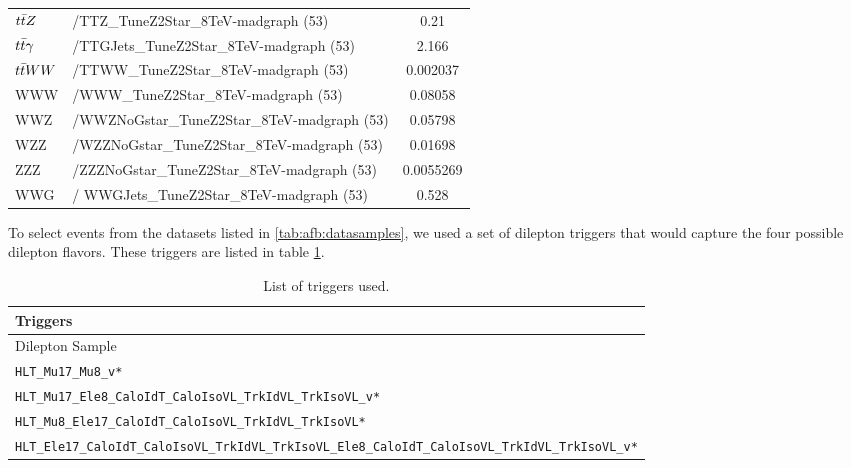 \begin{table}[!ht]
\begin{center}
{\begin{tabular}{l|l|c}
$t\bar{t} Z$                                       &   /TTZ\_TuneZ2Star\_8TeV-madgraph (53)                   &  0.21 \\
$t\bar{t} \gamma$                      &   /TTGJets\_TuneZ2Star\_8TeV-madgraph (53)            &  2.166 \\
$t\bar{t} W W$                                     &   /TTWW\_TuneZ2Star\_8TeV-madgraph (53)        &  0.002037  \\
WWW     & /WWW\_TuneZ2Star\_8TeV-madgraph (53)                  & 0.08058 \\
WWZ     & /WWZNoGstar\_TuneZ2Star\_8TeV-madgraph (53)           & 0.05798 \\
WZZ     & /WZZNoGstar\_TuneZ2Star\_8TeV-madgraph (53)           & 0.01698 \\
ZZZ     & /ZZZNoGstar\_TuneZ2Star\_8TeV-madgraph (53)           & 0.0055269 \\
WWG     & / WWGJets\_TuneZ2Star\_8TeV-madgraph (53)             & 0.528 \\
\hline\hline
\end{tabular}
}
\end{center}
\end{table}

To select events from the datasets listed in
\ref{tab:afb:datasamples}, we used a set of dilepton triggers that
would capture the four possible dilepton flavors. These triggers are
listed in table \ref{tab:afb:triggers}.

\begin{table}[!ht]
\begin{center}
\caption{List of triggers used.}
\label{tab:afb:triggers}
\begin{tabular}{l}
\hline\hline
Triggers   \\
\hline\hline
Dilepton Sample \\
\hline
\footnotesize{\verb=HLT_Mu17_Mu8_v*=}\\
\footnotesize{\verb=HLT_Mu17_Ele8_CaloIdT_CaloIsoVL_TrkIdVL_TrkIsoVL_v*=}\\
\footnotesize{\verb=HLT_Mu8_Ele17_CaloIdT_CaloIsoVL_TrkIdVL_TrkIsoVL*=}\\
\footnotesize{\verb=HLT_Ele17_CaloIdT_CaloIsoVL_TrkIdVL_TrkIsoVL_Ele8_CaloIdT_CaloIsoVL_TrkIdVL_TrkIsoVL_v*=}\\
\hline
\end{tabular}
\end{center}
\end{table}

